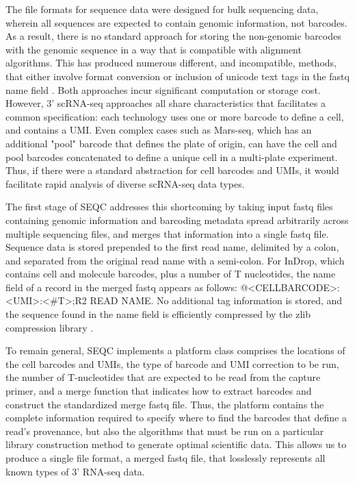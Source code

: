 The file formats for sequence data were designed for bulk sequencing data, wherein all sequences are expected to contain genomic information, not barcodes.
As a result, there is no standard approach for storing the non-genomic barcodes with the genomic sequence in a way that is compatible with alignment algorithms.
This has produced numerous different, and incompatible, methods, that either involve format conversion \citep{Macosko2015} or inclusion of unicode text tags in the fastq name field \citep{Jaitin2014}. 
Both approaches incur significant computation or storage cost.
However, 3' scRNA-seq approaches all share characteristics that facilitates a common specification: each technology uses one or more barcode to define a cell, and contains a UMI\@. 
Even complex cases such as Mars-seq, which has an additional "pool" barcode that defines the plate of origin, can have the cell and pool barcodes concatenated to define a unique cell in a multi-plate experiment.
Thus, if there were a standard abstraction for cell barcodes and UMIs, it would facilitate rapid analysis of diverse scRNA-seq data types.

The first stage of SEQC addresses this shortcoming by taking input fastq files containing genomic information and barcoding metadata spread arbitrarily across multiple sequencing files, and merges that information into a single fastq file. 
Sequence data is stored prepended to the first read name, delimited by a colon, and separated from the original read name with a semi-colon.
For InDrop, which contains cell and molecule barcodes, plus a number of T nucleotides, the name field of a record in the merged fastq appears as follows: {\mono @<CELLBARCODE>:<UMI>:<\#T>;R2 READ NAME}.
No additional tag information is stored, and the sequence found in the name field is efficiently compressed by the zlib compression library \citep{Gailly2004}.

To remain general, SEQC implements a platform class comprises the locations of the cell barcodes and UMIs, the type of barcode and UMI correction to be run, the number of T-nucleotides that are expected to be read from the capture primer, and a merge function that indicates how to extract barcodes and construct the standardized merge fastq file. 
Thus, the platform contains the complete information required to specify where to find the barcodes that define a read's provenance, but also the algorithms that must be run on a particular library construction method to generate optimal scientific data. This allows us to produce a single file format, a merged fastq file, that losslessly represents all known types of 3' RNA-seq data. 

